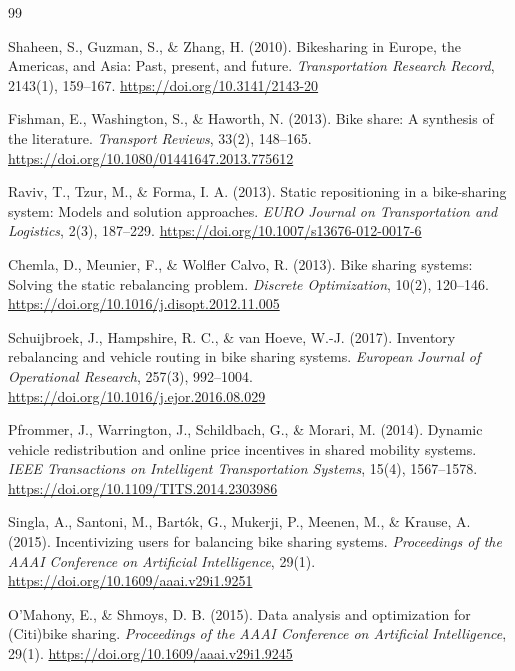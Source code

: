 \begin{thebibliography}{99}
\scriptsize
\setlength{\itemsep}{0pt}
\setlength{\parsep}{0pt}
\setlength{\parskip}{0pt}
\raggedright

Shaheen, S., Guzman, S., \& Zhang, H. (2010). Bikesharing in Europe, the Americas, and
Asia: Past, present, and future. \emph{Transportation Research Record}, 2143(1),
159--167. \url{https://doi.org/10.3141/2143-20}

Fishman, E., Washington, S., \& Haworth, N. (2013). Bike share: A synthesis of the
literature. \emph{Transport Reviews}, 33(2), 148--165.
\url{https://doi.org/10.1080/01441647.2013.775612}

Raviv, T., Tzur, M., \& Forma, I. A. (2013). Static repositioning in a bike-sharing
system: Models and solution approaches. \emph{EURO Journal on Transportation and
Logistics}, 2(3), 187--229. \url{https://doi.org/10.1007/s13676-012-0017-6}

Chemla, D., Meunier, F., \& Wolfler Calvo, R. (2013). Bike sharing systems: Solving the
static rebalancing problem. \emph{Discrete Optimization}, 10(2), 120--146.
\url{https://doi.org/10.1016/j.disopt.2012.11.005}

Schuijbroek, J., Hampshire, R. C., \& van Hoeve, W.-J. (2017). Inventory rebalancing and
vehicle routing in bike sharing systems. \emph{European Journal of Operational
Research}, 257(3), 992--1004. \url{https://doi.org/10.1016/j.ejor.2016.08.029}

Pfrommer, J., Warrington, J., Schildbach, G., \& Morari, M. (2014). Dynamic vehicle
redistribution and online price incentives in shared mobility systems. \emph{IEEE
Transactions on Intelligent Transportation Systems}, 15(4), 1567--1578.
\url{https://doi.org/10.1109/TITS.2014.2303986}

Singla, A., Santoni, M., Bart\'ok, G., Mukerji, P., Meenen, M., \& Krause, A. (2015).
Incentivizing users for balancing bike sharing systems. \emph{Proceedings of the AAAI
Conference on Artificial Intelligence}, 29(1).
\url{https://doi.org/10.1609/aaai.v29i1.9251}

O'Mahony, E., \& Shmoys, D. B. (2015). Data analysis and optimization for (Citi)bike
sharing. \emph{Proceedings of the AAAI Conference on Artificial Intelligence}, 29(1).
\url{https://doi.org/10.1609/aaai.v29i1.9245}


\end{thebibliography}
